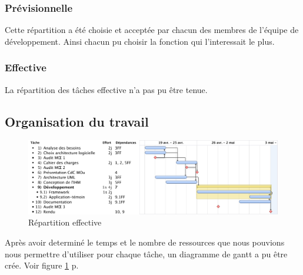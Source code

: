 \subsubsection{Prévisionnelle}

Cette répartition a été choisie et acceptée par chacun des membres de l'équipe de développement.
Ainsi chacun pu choisir la fonction qui l'interessait le plus.

\subsubsection{Effective}

La répartition des tâches effective n'a pas pu être tenue.

\subsection{Organisation du travail}
\begin{figure}[thbp]
	\centering
		\includegraphics[angle=90, scale=0.7]{../diagrammes/gantt_final.pdf}
	\caption{Répartition effective}
	\label{fig:gantt}
\end{figure}

Après avoir determiné le temps et le nombre de ressources que nous pouvions nous permettre d'utiliser pour chaque tâche, un diagramme de gantt a pu être crée. Voir figure  \ref{fig:gantt} p.\pageref{fig:gantt}